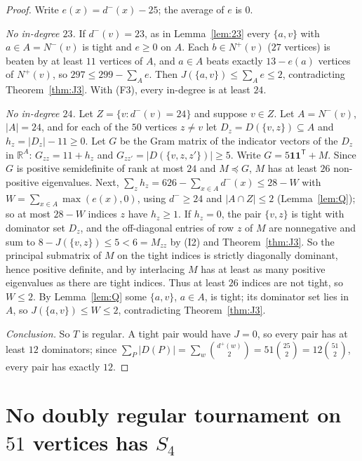 \documentclass[11pt]{amsart}
\theoremstyle{definition}
\theoremstyle{remark}
\newcommand{\D}{D}
\newcommand{\Nin}{N^{-}}
\newcommand{\Nout}{N^{+}}
\newcommand{\din}{d^{-}}
\newcommand{\dout}{d^{+}}
\newcommand{\abs}[1]{\lvert #1\rvert}
\begin{document}
\begin{proof}
Write $e(x)=\din(x)-25$; the average of $e$ is $0$.

\emph{No in-degree $23$.} If $\din(v)=23$, as in Lemma~\ref{lem:23} every $\{a,v\}$ with $a\in A=\Nin(v)$ is tight and $e\ge0$ on
$A$. Each $b\in\Nout(v)$ ($27$ vertices) is beaten by at least $11$ vertices of $A$, and $a\in A$ beats exactly $13-e(a)$ vertices of
$\Nout(v)$, so $297\le299-\sum_Ae$. Then $J(\{a,v\})\le\sum_Ae\le2$, contradicting Theorem~\ref{thm:J3}. With (F3), every in-degree
is at least $24$.

\emph{No in-degree $24$.} Let $Z=\{v:\din(v)=24\}$ and suppose $v\in Z$. Let $A=\Nin(v)$, $\abs A=24$, and for each of the $50$
vertices $z\ne v$ let $D_z=\D(\{v,z\})\subseteq A$ and $h_z=\abs{D_z}-11\ge0$. Let $G$ be the Gram matrix of the indicator vectors of
the $D_z$ in $\mathbb R^A$: $G_{zz}=11+h_z$ and $G_{zz'}=\abs{\D(\{v,z,z'\})}\ge5$. Write $G=5\mathbf 1\mathbf 1^{\mathsf T}+M$. Since
$G$ is positive semidefinite of rank at most $24$ and $M\preceq G$, $M$ has at least $26$ non-positive eigenvalues. Next,
$\sum_zh_z=626-\sum_{x\in A}\din(x)\le28-W$ with $W=\sum_{x\in A}\max(e(x),0)$, using $\din\ge24$ and $\abs{A\cap Z}\le2$
(Lemma~\ref{lem:Q}); so at most $28-W$ indices $z$ have $h_z\ge1$. If $h_z=0$, the pair $\{v,z\}$ is tight with dominator set $D_z$,
and the off-diagonal entries of row $z$ of $M$ are nonnegative and sum to $8-J(\{v,z\})\le5<6=M_{zz}$ by (I2) and
Theorem~\ref{thm:J3}. So the principal submatrix of $M$ on the tight indices is strictly diagonally dominant, hence positive
definite, and by interlacing $M$ has at least as many positive eigenvalues as there are tight indices. Thus at least $26$ indices are
not tight, so $W\le2$. By Lemma~\ref{lem:Q} some $\{a,v\}$, $a\in A$, is tight; its dominator set lies in $A$, so
$J(\{a,v\})\le W\le2$, contradicting Theorem~\ref{thm:J3}.

\emph{Conclusion.} So $T$ is regular. A tight pair would have $J=0$, so every pair has at least $12$ dominators; since
$\sum_P\abs{\D(P)}=\sum_w\binom{\dout(w)}2=51\binom{25}2=12\binom{51}2$, every pair has exactly $12$.
\end{proof}

\section{\texorpdfstring{No doubly regular tournament on $51$ vertices has $S_4$}{No doubly regular tournament on 51 vertices has S4}}\label{sec:drt}
\end{document}
